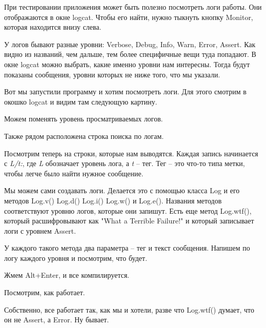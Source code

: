 

При тестировании приложения может быть полезно посмотреть логи работы. Они отображаются в окне logcat. Чтобы его найти, нужно тыкнуть кнопку Monitor, которая находится внизу слева.


У логов бывают разные уровни: Verbose, Debug, Info, Warn, Error, Assert. Как видно из названий, чем дальше, тем более специфичные вещи туда попадают. В окне logcat можно выбрать, какие именно уровни нам интересны. Тогда будут показаны сообщения, уровни которых не ниже того, что мы указали. 


Вот мы запустили программу и хотим посмотреть логи. Для этого смотрим в окошко logcat и видим там следующую картину. 


Можем поменять уровень просматриваемых логов.


Также рядом расположена строка поиска по логам.

Посмотрим теперь на строки, которые нам выводятся. 
Каждая запись начинается с \textit{L/t:}, где \textit{L} обозначает уровень лога, а \textit{t} -- тег. Тег -- это что-то типа метки, чтобы легче было найти нужное сообщение.


Мы можем сами создавать логи. Делается это с помощью класса Log и его методов Log.v() Log.d() Log.i() Log.w() и Log.e(). Названия методов соответствуют уровню логов, которые они запишут. Есть еще метод Log.wtf(), который расшифровывают как "What a Terrible Failure!" и который записывает логи с уровнем Assert. 

У каждого такого метода два параметра -- тег и текст сообщения. Напишем по логу каждого уровня и посмотрим, что будет.


Жмем Alt+Enter, и все компилируется.

Посмотрим, как работает.


Собственно, все работает так, как мы и хотели, разве что Log.wtf() думает, что он не Assert, а Error. Ну бывает. 




